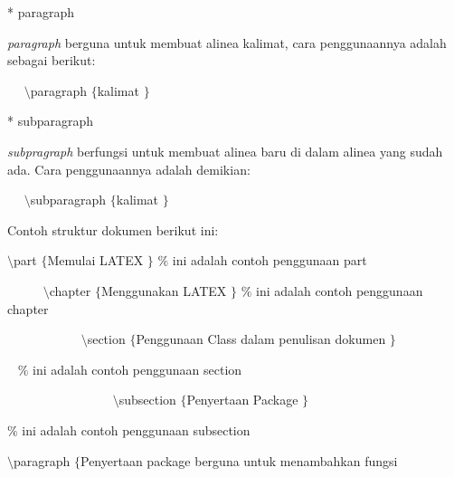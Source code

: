   \vspace{10pt}
 * paragraph \par
\textit{paragraph} berguna untuk membuat alinea kalimat, cara penggunaannya adalah sebagai berikut:
 \par
{\fontsize{10pt}{10pt}\selectfont ~~  $  \setminus  $paragraph $  \{  $kalimat $  \}  $}
 \par
  \vspace{10pt}
 * subparagraph \par
\textit{subpragraph} berfungsi untuk membuat alinea baru di dalam alinea yang sudah ada. Cara penggunaannya adalah demikian:
 \par
{\fontsize{10pt}{10pt}\selectfont ~~  $  \setminus  $subparagraph $  \{  $kalimat $  \}  $}
 \par
\vspace{10pt}
Contoh struktur dokumen berikut ini:
 \par
{\fontsize{10pt}{10pt}\selectfont  $  \setminus  $part $  \{  $Memulai LATEX $  \}  $  $  \%  $ ini adalah contoh penggunaan part}
 \par
{\fontsize{10pt}{10pt}\selectfont ~~~~~  $  \setminus  $chapter $  \{  $Menggunakan LATEX $  \}  $  $  \%  $ ini adalah contoh penggunaan chapter}
 \par
{\fontsize{10pt}{10pt}\selectfont ~~~~~~~~~~~  $  \setminus  $section $  \{  $Penggunaan Class dalam penulisan dokumen $  \}  $}
 \par
{\fontsize{10pt}{10pt}\selectfont  \hspace*{0.64in} ~  \hspace*{0.64in}  \hspace*{0.64in}  $  \%  $ ini adalah contoh penggunaan section}
 \par
{\fontsize{10pt}{10pt}\selectfont ~~~~~~~~~~~~~~~~ $  \setminus  $subsection $  \{  $Penyertaan Package $  \}  $  }
 \par
{\fontsize{10pt}{10pt}\selectfont  \hspace*{0.64in}  \hspace*{0.64in}  \hspace*{0.64in}  $  \%  $ ini adalah contoh penggunaan subsection}
 \par
{\fontsize{10pt}{10pt}\selectfont  \hspace*{0.64in}  \hspace*{0.64in}  \hspace*{0.64in}  $  \setminus  $paragraph $  \{  $Penyertaan package berguna untuk menambahkan fungsi }
 \par

